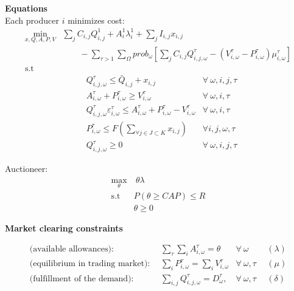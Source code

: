 \documentclass[11pt, letterpaper]{article}
\begin{document}
\begin{flushleft}
\hspace{0.5cm}

\textbf{Equations}\\

Each producer $i$ minimizes cost:
\begin{align}
    \min_{ x,Q,A,P,V} & \sum_{j}C_{i,j} Q^{1}_{i,j} + A^{1}_i\lambda^{1}_i + \sum_{j}I_{i,j}x_{i,j} \nonumber \\
     &\qquad - \sum_{\tau > 1} \sum_{\Omega}prob_\omega[\sum_j C_{i,j} Q^{\tau}_{i,j,\omega}  - (V^{\tau}_{i,\omega}-P^{\tau}_{i,\omega})\mu^{\tau}_{i,\omega}]\\
 \textrm{s.t \ } \nonumber
 \end{align}
 \begin{align}
 & Q^{\tau}_{i,j,\omega} \leq \bar{Q}_{i,j} + x_{i,j}  & \forall \ \omega, i, j, \tau \\
 & A^{\tau}_{i,\omega} + P^{\tau}_{i,\omega} \geq V^{\tau}_{i,\omega} & \forall \ \omega, i,\tau \\
 & Q^{\tau}_{i, j, \omega}\varepsilon^{\tau}_{i,\omega} \leq A^{\tau}_{i,\omega} + P^{\tau}_{i,\omega} - V^{\tau}_{i,\omega}  & \forall \ \omega, i,\tau \\
 & P^{\tau}_{i,\omega} \leq F(\sum_{\forall j \in J \subset K} x_{i,j}) & \forall i, j, \omega, \tau  \\
 & Q^{\tau}_{i, j, \omega} \geq 0  & \forall \ \omega, i, j, \tau
\end{align}

Auctioneer:
\begin{align}
    \max_{\theta} & \ \theta \lambda \\
    \textrm{s.t \ } & P(\theta \geq CAP) \leq R\\
    & \theta \geq 0
\end{align}

\textbf{Market clearing constraints}

\begin{align}
\textrm{(available allowances)}: &  \ \   \sum_{\tau} \sum_{i} A^{\tau}_{i,\omega} = \theta   & \forall \ \omega & \ \  (\lambda)\\
\textrm{(equilibrium in trading market)}: &   \ \  \sum_{i} P^{\tau}_{i,\omega} = \sum_{i} V^{\tau}_{i,\omega} & \forall \ \omega, \tau & \ \ (\mu) \\
\textrm{(fulfillment of the demand)}:  &   \ \  \sum_{i,j} Q^{\tau}_{i, j,\omega} = D^{\tau}_{\omega}, & \forall \ \omega, \tau & \ \ (\delta)
\end{align}

\end{flushleft}
\end{document}

